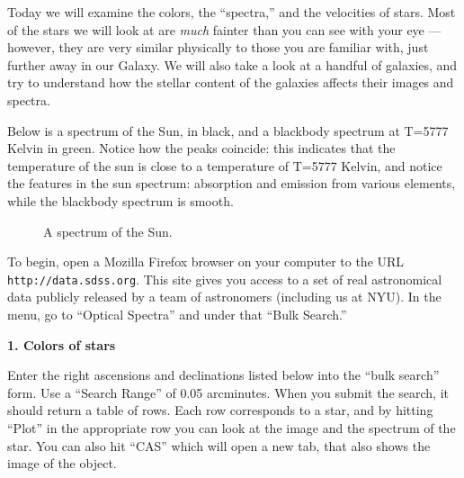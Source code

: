 
\noindent Today we will examine the colors, the ``spectra,'' and the
velocities of stars. Most of the stars we will look at are {\it much}
fainter than you can see with your eye --- however, they are very
similar physically to those you are familiar with, just further away
in our Galaxy. We will also take a look at a handful of galaxies, and
try to understand how the stellar content of the galaxies affects
their images and spectra.

\noindent Below is a spectrum of the Sun, in black, and a blackbody
spectrum at T=5777 Kelvin in green. Notice how the peaks coincide:
this indicates that the temperature of the sun is close to a
temperature of T=5777 Kelvin, and notice the features in the sun
spectrum: absorption and emission from various elements, while the
blackbody spectrum is smooth.

\begin{figure*}[h!]
\begin{center}{} \caption{A
spectrum of the Sun.}
\end{center}
\end{figure*}

\noindent To begin, open a Mozilla Firefox browser on your computer to
the URL {\tt http://data.sdss.org}.  This site gives you access to a
set of real astronomical data publicly released by a team of
astronomers (including us at NYU).  In the menu, go to ``Optical
Spectra'' and under that ``Bulk Search.''

\noindent
{\bf 1. Colors of stars}

\noindent Enter the right ascensions and declinations listed below
into the ``bulk search'' form. Use a ``Search Range'' of 0.05
arcminutes. When you submit the search, it should return a table of
rows.  Each row corresponds to a star, and by hitting ``Plot'' in the
appropriate row you can look at the image and the spectrum of the
star. You can also hit ``CAS'' which will open a new tab, that also
shows the image of the object.

